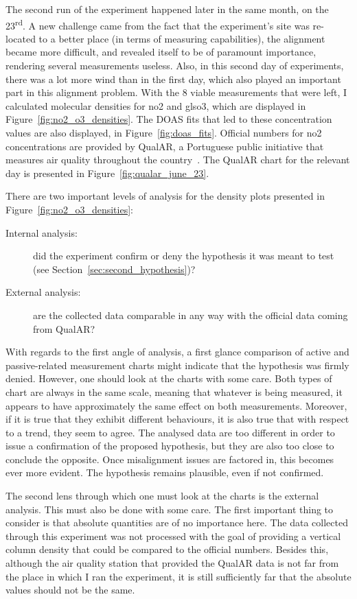 The second run of the experiment happened later in the same month, on
the 23\textsuperscript{rd}. A new challenge came from the fact that the
experiment's site was re-located to a better place (in terms of
measuring capabilities),  the alignment became more difficult, and
revealed itself to be of paramount importance, rendering several
measurements useless. Also, in this second day of experiments, there was
a lot more wind than in the first day, which also played an important
part in this alignment problem. With the 8 viable measurements that were
left, I calculated molecular densities for \gls{no2} and gls{o3}, which
are displayed in Figure~\ref{fig:no2_o3_densities}. The \gls{DOAS} fits
that led to these concentration values are also displayed, in
Figure~\ref{fig:doas_fits}. Official numbers for \gls{no2}
concentrations are provided by QualAR, a Portuguese public initiative
that measures air quality throughout the country~\cite{agencia2019}. The
QualAR chart for the relevant day is presented in
Figure~\ref{fig:qualar_june_23}. 

There are two important levels of analysis for the density plots
presented in Figure~\ref{fig:no2_o3_densities}:
\begin{description}
    \item[Internal analysis:] did the experiment confirm or deny the
        hypothesis it was meant to test (see
        Section~\ref{sec:second_hypothesis})?
    \item[External analysis:] are the collected data comparable in any
        way with the official data coming from QualAR?
\end{description}

With regards to the first angle of analysis, a first glance comparison
of active and passive-related measurement charts might indicate that the
hypothesis was firmly denied. However, one should look at the charts
with some care. Both types of chart are always in the same scale,
meaning that whatever is being measured, it appears to have
approximately the same effect on both measurements. Moreover, if it is
true that they exhibit different behaviours, it is also true that with
respect to a trend, they seem to agree. The analysed data are too
different in order to issue a confirmation of the proposed hypothesis,
but they are also too close to conclude the opposite. Once misalignment
issues are factored in, this becomes ever more evident. The hypothesis
remains plausible, even if not confirmed. 

The second lens through which one must look at the charts is the
external analysis. This must also be done with some care. The first
important thing to consider is that absolute quantities are of no
importance here. The data collected through this experiment was not
processed with the goal of providing a vertical column density that
could be compared to the official numbers. Besides this, although the
air quality station that provided the QualAR data is not far from the
place in which I ran the experiment, it is still sufficiently far that
the absolute values should not be the same.

